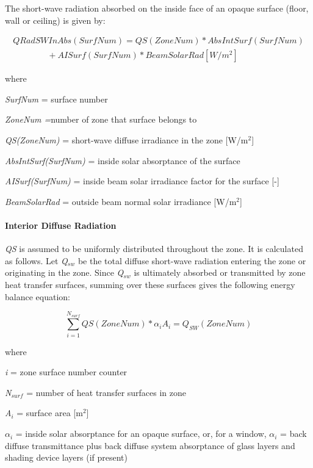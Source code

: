 The short-wave radiation absorbed on the inside face of an opaque surface (floor, wall or ceiling) is given by:

\begin{equation}
\begin{array}{l}
QRadSWInAbs(SurfNum) = QS(ZoneNum)*AbsIntSurf(SurfNum) \\
\quad \quad \quad \quad+ AISurf(SurfNum)*BeamSolarRad [W/m^2]
\end{array}
\label{eq:ShortWaveRadInsideFaceOpaqueSurf}
\end{equation}

where

\emph{SurfNum} = surface number

\emph{ZoneNum =}number of zone that surface belongs to

\emph{QS(ZoneNum)} = short-wave diffuse irradiance in the zone {[}W/m\(^{2}\){]}

\emph{AbsIntSurf(SurfNum)} = inside solar absorptance of the surface

\emph{AISurf(SurfNum)} = inside beam solar irradiance factor for the surface {[}-{]}

\emph{BeamSolarRad} = outside beam normal solar irradiance {[}W/m\(^{2}\){]}

\paragraph{Interior Diffuse Radiation}\label{interior-diffuse-radiation}

\emph{QS} is assumed to be uniformly distributed throughout the zone. It is calculated as follows. Let \emph{Q\(_{sw}\)} be the total diffuse short-wave radiation entering the zone or originating in the zone. Since \emph{Q\(_{sw}\)} is ultimately absorbed or transmitted by zone heat transfer surfaces, summing over these surfaces gives the following energy balance equation:

\begin{equation}
\sum\limits_{i = 1}^{{N_{surf}}} {QS(ZoneNum)*{\alpha_i}{A_i} = {Q_{SW}}(ZoneNum)}
\end{equation}

where

\emph{i} = zone surface number counter

\emph{N\(_{surf}\)} = number of heat transfer surfaces in zone

\emph{A\(_{i}\)} = surface area {[}m\(^{2}\){]}

\({\alpha_i}\) = inside solar absorptance for an opaque surface, or, for a window, $\alpha_i$ = back diffuse transmittance plus back diffuse system absorptance of glass layers and shading device layers (if present)

